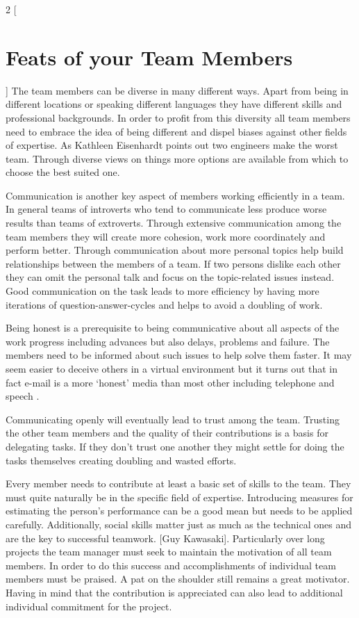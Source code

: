\begin{multicols}{2}
[\section{Feats of your Team Members}]
The team members can be diverse in many different ways. Apart from being in different locations or speaking different languages they have different skills and professional backgrounds. In order to profit from this diversity all team members need to embrace the idea of being different and dispel biases against other fields of expertise. As Kathleen Eisenhardt points out two engineers make the worst team. Through diverse views on things more options are available from which to choose the best suited one.

Communication is another key aspect of members working efficiently in a team. In general teams of introverts who tend to communicate less  produce worse results than teams of extroverts. Through extensive communication among the team members they will create more cohesion, work more coordinately and perform better. Through communication about more personal topics help build relationships between the members of a team. If two persons dislike each other they can omit the personal talk and focus on the topic-related issues instead.
Good communication on the task leads to more efficiency by having more iterations of question-answer-cycles and helps to avoid a doubling of work.

Being honest is a prerequisite to being communicative about all aspects of the work progress including advances but also delays, problems and failure. The members need to be informed about such issues to help solve them faster. It may seem easier to deceive others in a virtual environment but it turns out that in fact e-mail is a more ‘honest’ media than most other including telephone and speech \cite{TED}.

Communicating openly will eventually lead to trust among the team. Trusting the other team members and the quality of their contributions is a basis for delegating tasks. If they don’t trust one another they might settle for doing the tasks themselves creating doubling and wasted efforts.

Every member needs to contribute at least a basic set of skills to the team. They must quite naturally be in the specific field of expertise. Introducing measures for estimating the person’s performance can be a good mean but needs to be applied carefully. Additionally, social skills matter just as much as the technical ones and are the key to  successful teamwork. [Guy Kawasaki].
Particularly over long projects the team manager must seek to maintain the motivation of all team members. In order to do this success and accomplishments of individual team members must be praised. A pat on the shoulder still remains a great motivator. Having in mind that the contribution is appreciated can also lead to additional individual commitment  for the project.


\end{multicols}
